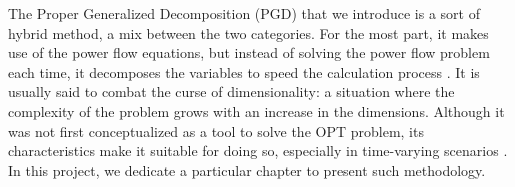 The Proper Generalized Decomposition (PGD) that we introduce is a sort of hybrid method, a mix between the two categories. For the most part, it makes use of the power flow equations, but instead of solving the power flow problem each time, it decomposes the variables to speed the calculation process \cite{chinesta2013proper}. It is usually said to combat the curse of dimensionality: a situation where the complexity of the problem grows with an increase in the dimensions. Although it was not first conceptualized as a tool to solve the OPT problem, its characteristics make it suitable for doing so, especially in time-varying scenarios \cite{blanco2017efficient}. In this project, we dedicate a particular chapter to present such methodology.

